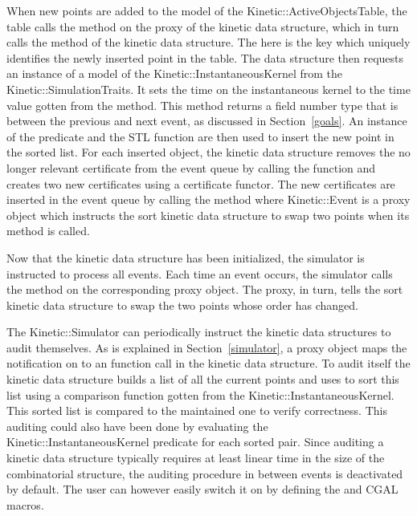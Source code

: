 When new points are added to the model of the
Kinetic::ActiveObjectsTable, the table calls the
 method on the proxy of the kinetic data
structure, which in turn calls the
 method of the kinetic data structure. The
 here is the key which uniquely identifies the
newly inserted point in the table. The data structure then requests an
instance of a model of the Kinetic::InstantaneousKernel from the
Kinetic::SimulationTraits. It sets the time on the instantaneous
kernel to the time value gotten from the
 method. This method returns
a field number type that is between the previous and next event, as
discussed in Section~\ref{goals}. An instance of the
 predicate and the STL
function  are then used to insert the new
point in the sorted list. For each inserted object, the kinetic data
structure removes the no
longer relevant certificate from the event queue by calling the
 function and creates two new
certificates using a 
certificate functor. The new certificates are inserted in the event
queue by calling the 
method where Kinetic::Event is a proxy object which instructs the sort
kinetic data structure to swap two points when its 
method is called.

Now that the kinetic data structure has been initialized, the
simulator is instructed to process all events. Each time an event
occurs, the simulator calls the  method on the
corresponding proxy object. The proxy, in turn, tells the sort kinetic
data structure to swap the two points whose order has changed.

The Kinetic::Simulator can periodically instruct the kinetic data
structures to audit themselves.  As is explained in
Section~\ref{simulator}, a proxy object maps the notification on to an
 function call in the kinetic data structure. To audit
itself the kinetic data structure builds a list of all the current
points and uses  to sort this list using a
comparison function gotten from the Kinetic::InstantaneousKernel.
This sorted list is compared to the maintained one to verify
correctness. This auditing could also have been done by evaluating the
Kinetic::InstantaneousKernel predicate for each sorted pair.  Since
auditing a kinetic data structure typically requires at least linear
time in the size of the combinatorial structure, the auditing
procedure in between events is deactivated by default.  The user can
however easily switch it on by defining the
 and  CGAL
macros.

